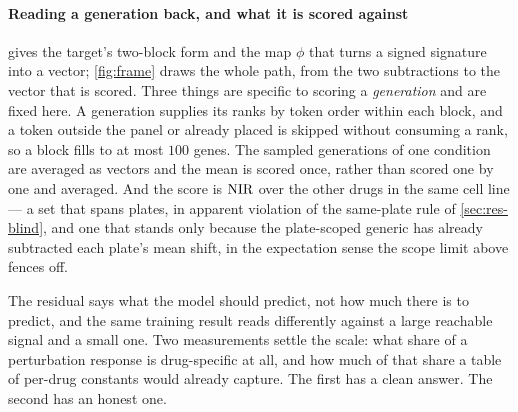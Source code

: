   \paragraph{Reading a generation back, and what it is scored against}
   gives the target's two-block form and the map $\phi$
  that turns a signed signature into a vector; \cref{fig:frame} draws the whole path,
  from the two subtractions to the vector that is scored. Three things are specific to
  scoring a \emph{generation} and are fixed here. A generation supplies its ranks by
  token order within each block, and a token outside the panel or already placed is
  skipped without consuming a rank, so a block fills to at most $100$ genes. The
  sampled generations of one condition are averaged as vectors and the mean is scored
  once, rather than scored one by one and averaged. And the score is $\textrm{NIR}$ over the
  other drugs in the same cell line --- a set that spans plates, in apparent violation
  of the same-plate rule of \cref{sec:res-blind}, and one that stands only because the
  plate-scoped generic has already subtracted each plate's mean shift, in the
  expectation sense the scope limit above fences off.
  
  
\label{sec:methods-vardecomp}

\begin{question}[5]
The residual says what the model should predict, not how much there is to
predict, and the same training result reads differently against a large reachable
signal and a small one. Two measurements settle the scale: what share of a
perturbation response is drug-specific at all, and how much of that share a table
of per-drug constants would already capture. The first has a clean answer. The
second has an honest one.
\end{question}

